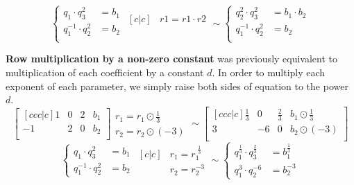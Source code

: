 \begin{equation}
    \begin{cases}
        q_1 \cdot q_3^2 &= b_1 \\
        q_1^{-1} \cdot q_2^2 &= b_2 \\
    \end{cases}
    \begin{matrix}[c|c]
        & r1 = r1 \cdot r2 \\
        & \\
    \end{matrix} \sim
    \begin{cases}
        q_2^2 \cdot q_3^{2} &= b_1 \cdot b_2 \\
        q_1^{-1} \cdot q_2^2 &= b_2 \\
    \end{cases}
\end{equation}

\textbf{Row multiplication by a non-zero constant} was previously equivalent to multiplication of each coefficient by a constant $d$.
In order to multiply each exponent of each parameter, we simply raise both sides of equation to the power $d$.
\begin{equation}
    \begin{bmatrix}[ccc|c]
        1 & 0 & 2 & b_1 \\
        -1 & 2 & 0 & b_2 \\
    \end{bmatrix}
    \begin{matrix}
        r_1 = r_1\odot \frac{1}{3} \\
        r_2 = r_2\odot (-3)
    \end{matrix}
    \sim
    \begin{bmatrix}[ccc|c]
        \frac{1}{3} & 0 & \frac{2}{3} & b_1 \odot \frac{1}{3} \\
        3 & -6 & 0 & b_2 \odot (-3) \\
    \end{bmatrix}
\end{equation}
\begin{equation}
    \begin{cases}
        q_1 \cdot q_3^2 &= b_1 \\
        q_1^{-1} \cdot q_2^{2} &= b_2
    \end{cases}
    \begin{matrix}[c|c]
        & r_1 = r_1 ^ {\;\frac{1}{3}} \\
        & r_2 = r_2 ^ {-3}
    \end{matrix}
    \sim
    \begin{cases}
        q_1^{\frac{1}{3}} \cdot q_3^{\frac{2}{3}} &= b_1^{\frac{1}{3}} \\
        q_1^{3} \cdot q_2^{-6} &= b_2^{-3}
    \end{cases}
\end{equation}

